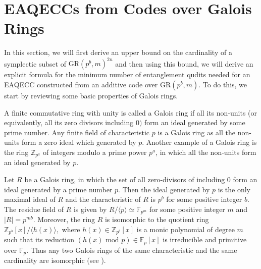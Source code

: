 \documentclass{article}
\theoremstyle{remark}
\theoremstyle{definition}
\numberwithin{equation}{section}
\begin{document}
\section{EAQECCs from Codes over Galois Rings}\label{sec5}
In this section, we will first derive an upper bound on the cardinality of a symplectic subset of $\text{GR}(p^b,m)^{2n}$ and then using this bound, we will derive an explicit formula for the minimum number of entanglement qudits needed for an EAQECC constructed from an additive code over $\text{GR}(p^b,m)$.  To do this, we start by reviewing some basic properties of Galois rings.

A finite commutative ring with unity is called a Galois ring if all its non-units (or equivalently, all its zero divisors  including $0)$ form an ideal generated by some prime number. Any finite field of characteristic $p$ is a Galois ring as all the non-units form a zero ideal which generated by $p$. Another example of a Galois ring is the ring $\mathbb{Z}_{p^a}$ of integers modulo a prime power $p^a$, in which all the non-units form an ideal generated by $p$.

Let $R$ be a Galois ring, in which the set of all zero-divisors of including $0$ form an ideal generated by a prime number $p$. Then the ideal generated by $p$ is the only maximal ideal of ${R}$ and the characteristic of ${R}$ is $p^b$ for some positive integer $b$. The residue field of ${R}$ is given by ${R} / \langle p \rangle \simeq  \mathbb{F}_{p^m}$ for some positive integer $m$ and  $|{R}|=p^{mb}.$ Moreover, the ring $R$ is isomorphic to the quotient ring $\mathbb{Z}_{p^b}[x]/ \langle h(x) \rangle,$ where  $h(x)\in \mathbb{Z}_{p^b}[x]$ is a monic polynomial of degree $m$ such that its reduction $(h(x) \text{ mod } p) \in \mathbb{F}_{p}[x]$ is irreducible and primitive over $\mathbb{F}_{p}.$ Thus any two Galois rings of  the same characteristic and the same cardinality are isomorphic (see \cite[Chp. 14]{wan}). 
\end{document}
